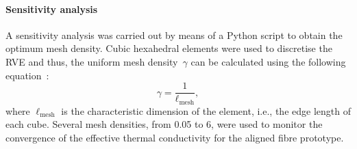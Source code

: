 	\paragraph{Sensitivity analysis} A sensitivity analysis was carried out by means of a Python script to obtain the optimum mesh density. Cubic hexahedral elements were used to discretise the RVE and thus, the uniform mesh density~$\gamma$ can be calculated using the following equation~\autocite{Javanbakht.2016}:
	\begin{equation}
	\gamma=\frac{1}{\ell_\text{mesh}},
	\end{equation}
	where $\ell_\text{mesh}$ is the characteristic dimension of the element, i.e., the edge length of each cube. Several mesh densities, from 0.05 to 6, were used to monitor the convergence of the effective thermal conductivity for the aligned fibre prototype.	
	
